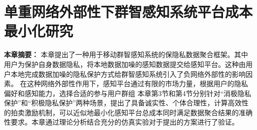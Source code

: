 \chapter{单重网络外部性下群智感知系统平台成本最小化研究}

\textbf{本章摘要：} 
本章提出了一种用于移动群智感知系统的保隐私数据聚合框架。其中用户为保护自身数据隐私，将本地数据加噪的感知数据提交给感知平台。这种由用户本地完成数据加噪的隐私保护方式给群智感知系统引入了{\kaishu 负网络外部性}的影响因素。
在这种网络外部性作用下，感知平台通过有限的市场力量，根据用户的隐私偏好和感知能力，选择合适的参与用户群组
本章第3节和第4节分别针对“消极隐私保护”和“积极隐私保护”两种场景，提出了具备诚实性、个体合理性，计算高效性的拍卖激励机制，可以近似地最小化感知平台总成本同时满足数据聚合结果的准确性要求。本章通过理论分析结合充分的仿真实验对于提出的方案进行了验证。


